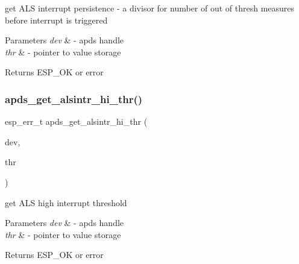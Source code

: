\begin{DoxyItemize}
\item get A\+LS interrupt persistence -\/ a divisor for number of out of thresh measures before interrupt is triggered 
\end{DoxyItemize}


\begin{DoxyParams}{Parameters}
{\em dev} & -\/ apds handle \\
\hline
{\em thr} & -\/ pointer to value storage \\
\hline
\end{DoxyParams}
\begin{DoxyReturn}{Returns}
E\+S\+P\+\_\+\+OK or error 
\end{DoxyReturn}
\mbox{\label{group__APDS9960__ALSFunctions_ga54ea839c8b87a929450d56142685083c}} 
\subsubsection{\texorpdfstring{apds\+\_\+get\+\_\+alsintr\+\_\+hi\+\_\+thr()}{apds\_get\_alsintr\_hi\_thr()}}
{\footnotesize\ttfamily esp\+\_\+err\+\_\+t apds\+\_\+get\+\_\+alsintr\+\_\+hi\+\_\+thr (\begin{DoxyParamCaption}\item[{\hyperlink{structAPDS9960__Driver}{A\+P\+D\+S\+\_\+\+D\+EV}}]{dev,  }\item[{\hyperlink{vl53l0x__types_8h_a273cf69d639a59973b6019625df33e30}{uint16\+\_\+t} $\ast$}]{thr }\end{DoxyParamCaption})}




\begin{DoxyItemize}
\item get A\+LS high interrupt threshold 
\end{DoxyItemize}


\begin{DoxyParams}{Parameters}
{\em dev} & -\/ apds handle \\
\hline
{\em thr} & -\/ pointer to value storage \\
\hline
\end{DoxyParams}
\begin{DoxyReturn}{Returns}
E\+S\+P\+\_\+\+OK or error 
\end{DoxyReturn}
\mbox{\label{group__APDS9960__ALSFunctions_gafeb7a3dee00d64dfd379a611afdde790}} 
